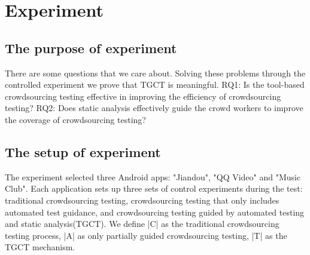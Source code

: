 \section{Experiment}

\subsection{The purpose of experiment}
There are some questions that we care about. Solving these problems through the controlled experiment we prove that TGCT is meaningful. RQ1: Is the tool-based crowdsourcing testing effective in improving the efficiency of crowdsourcing testing? RQ2: Does static analysis effectively guide the crowd workers to improve the coverage of crowdsourcing testing? 

\subsection{The setup of experiment}
The experiment selected three Android apps: "Jiandou", "QQ Video" and "Music Club". Each application sets up three sets of control experiments during the test: traditional crowdsourcing testing, crowdsourcing testing that only includes automated test guidance, and crowdsourcing testing guided by automated testing and static analysis(TGCT). We define |C| as the traditional crowdsourcing testing process, |A| as only partially guided crowdsourcing testing, |T| as the TGCT mechanism.


